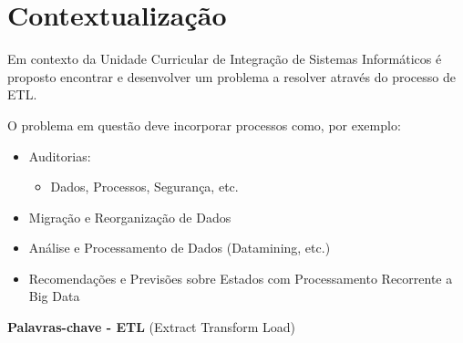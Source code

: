 \chapter{Contextualização}

Em contexto da Unidade Curricular de Integração de Sistemas Informáticos é proposto encontrar e desenvolver um problema a resolver através do processo de ETL.

O problema em questão deve incorporar processos como, por exemplo: 
\begin{itemize}
    \item Auditorias:
    \begin{itemize}
        \item Dados, Processos, Segurança, etc.
    \end{itemize}
    \item Migração e Reorganização de Dados
    \item Análise e Processamento de Dados (Datamining, etc.)
    \item Recomendações e Previsões sobre Estados com Processamento Recorrente a Big Data
\end{itemize}

\vfill
\small{\textbf{Palavras-chave - ETL} (Extract Transform Load)}